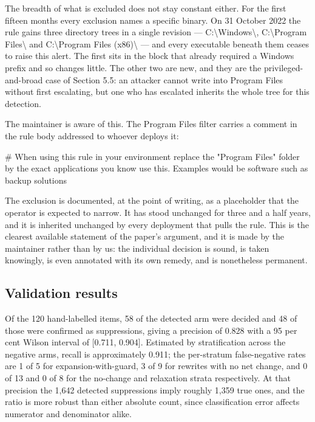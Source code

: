 The breadth of what is excluded does not stay constant either. For the first fifteen months every exclusion names a specific binary. On 31 October 2022 the rule gains three directory trees in a single revision --- C:\textbackslash{}Windows\textbackslash{}, C:\textbackslash{}Program Files\textbackslash{} and C:\textbackslash{}Program Files (x86)\textbackslash{} --- and every executable beneath them ceases to raise this alert. The first sits in the block that already required a Windows prefix and so changes little. The other two are new, and they are the privileged-and-broad case of Section 5.5: an attacker cannot write into Program Files without first escalating, but one who has escalated inherits the whole tree for this detection.

The maintainer is aware of this. The Program Files filter carries a comment in the rule body addressed to whoever deploys it:

\# When using this rule in your environment replace the "Program Files" folder by the exact applications you know use this. Examples would be software such as backup solutions

The exclusion is documented, at the point of writing, as a placeholder that the operator is expected to narrow. It has stood unchanged for three and a half years, and it is inherited unchanged by every deployment that pulls the rule. This is the clearest available statement of the paper's argument, and it is made by the maintainer rather than by us: the individual decision is sound, is taken knowingly, is even annotated with its own remedy, and is nonetheless permanent.

\subsection{Validation results}

Of the 120 hand-labelled items, 58 of the detected arm were decided and 48 of those were confirmed as suppressions, giving a precision of 0.828 with a 95 per cent Wilson interval of [0.711, 0.904]. Estimated by stratification across the negative arms, recall is approximately 0.911; the per-stratum false-negative rates are 1 of 5 for expansion-with-guard, 3 of 9 for rewrites with no net change, and 0 of 13 and 0 of 8 for the no-change and relaxation strata respectively. At that precision the 1,642 detected suppressions imply roughly 1,359 true ones, and the ratio is more robust than either absolute count, since classification error affects numerator and denominator alike.

